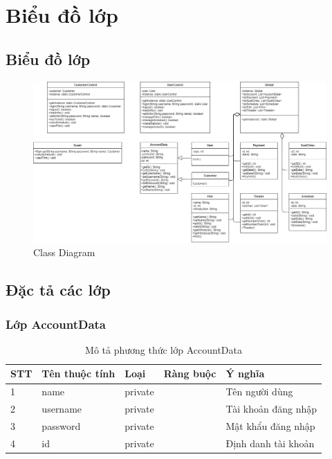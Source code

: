 \documentclass[a4paper, 12pt]{article}
\begin{document}
	\clearpage


\section{Biểu đồ lớp}

\subsection{Biểu đồ lớp}
\begin{figure}[H]
	\begin{center}
		\includegraphics[angle=90,scale=0.5]{image/5.0.png}
		\caption{Class Diagram}
	\end{center}
\end{figure}

\subsection{Đặc tả các lớp}

\subsubsection{Lớp AccountData}
\begin{table}[h]
	\begin{center}
		\begin{tabular}{|l|l|l|l|l|}
		\hline
		STT & Tên thuộc tính & Loại   & Ràng buộc & Ý nghĩa             \\ \hline
		1   & name           & private &           & Tên người dùng      \\ \hline
		2   & username       & private &           & Tài khoản đăng nhập \\ \hline
		3   & password       & private &           & Mật khẩu đăng nhập  \\ \hline
		4   & id             & private &           & Định danh tài khoản \\ \hline
		\end{tabular}
		\caption{Mô tả phương thức lớp AccountData}
	\end{center}
\end{table}
\end{document}
